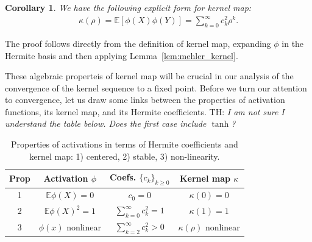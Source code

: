 \documentclass[twoside]{article}
\newcommand{\E}{\mathbb{E}}
\newcommand{\he}{\mathrm{he}}
\newtheorem{corollary}{Corollary}
\theoremstyle{definition}
\newcommand{\thomas}[1]{{\color{blue}TH:  \textit{#1}}}
\begin{document}
\begin{corollary}
    \label{cor:hermite_covariance}
    \label{cor:kernel_map}
We have the following explicit form for kernel map:
\begin{align*}
\kappa(\rho) = \E\left[\phi(X)\phi(Y)\right] = \sum_{k=0}^\infty c_k^2 \rho^k.
\end{align*}
\end{corollary}

The proof follows directly from the definition of kernel map, expanding $\phi$ in the Hermite basis and then applying Lemma~\ref{lem:mehler_kernel}. 


These algebraic properteis of kernel map will be crucial in our analysis of the convergence of the kernel sequence to a fixed point. Before we turn our attention to convergence, let us draw some links between the properties of activation functions, its kernel map, and its Hermite coefficients.
\thomas{I am not sure I understand the table below. Does the first case include $\tanh$?}

\begin{table}[ht]
\small 
    \centering
    \caption{Properties of activations in terms of Hermite coefficients and kernel map: 1) centered, 2) stable, 3) non-linearity. }
    \begin{tabular}{|c|c|c|c|}
    \hline 
 Prop & Activation $\phi$ & Coefs. $\{c_k\}_{k\ge 0}$ & Kernel map $\kappa$ \\
    \hline
 1 & $\E \phi(X)=0$ & $c_0 = 0$ & $\kappa(0) = 0$ \\
    \hline
 2 & $\E \phi(X)^2 = 1$ & $\sum_{k=0}^\infty c_k^2 = 1$ & $\kappa(1) = 1$ \\
    \hline
 3 & $\phi(x)$ nonlinear & $\sum_{k=2}^\infty c_k^2 > 0$ & $\kappa(\rho)$ nonlinear \\
    \hline
    \end{tabular}
\end{table}
\end{document}
